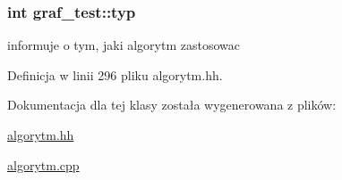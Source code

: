 \hypertarget{classgraf__test_a0d14d8d811514d102e082a2dc52a4813}{
\subsubsection[{typ}]{\setlength{\rightskip}{0pt plus 5cm}int graf\-\_\-test\-::typ}}\label{classgraf__test_a0d14d8d811514d102e082a2dc52a4813}


informuje o tym, jaki algorytm zastosowac 



Definicja w linii 296 pliku algorytm.\-hh.



Dokumentacja dla tej klasy została wygenerowana z plików\-:\begin{DoxyCompactItemize}
\item 
\hyperlink{algorytm_8hh}{algorytm.\-hh}\item 
\hyperlink{algorytm_8cpp}{algorytm.\-cpp}\end{DoxyCompactItemize}
